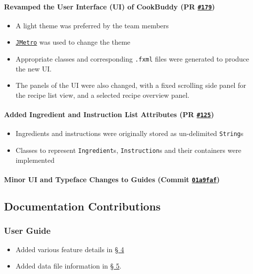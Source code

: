 \documentclass[11pt,british]{article}
\begin{document}
\paragraph{Revamped the User Interface (UI) of CookBuddy (PR \href{https://github.com/AY1920S2-CS2103T-W12-4/main/pull/179}{\texttt{\#179}}) } 
\begin{itemize}
	\item A light theme was preferred by the team members
	\item \href{https://pixelduke.com/java-javafx-theme-jmetro/}{\texttt{JMetro}} was used to change the theme
	\item Appropriate classes and corresponding \texttt{.fxml} files were generated to produce the new UI.
	\item The panels of the UI were also changed, with a fixed scrolling side panel for the recipe list view, and a selected recipe overview panel.
\end{itemize}

\paragraph{Added Ingredient and Instruction List Attributes (PR \href{https://github.com/AY1920S2-CS2103T-W12-4/main/pull/125}{\texttt{\#125}}) }
\begin{itemize}
	\item Ingredients and instructions were originally stored as un-delimited \texttt{String}s
	\item Classes to represent \texttt{Ingredient}s, \texttt{Instruction}s and their containers were implemented
\end{itemize}

\paragraph{Minor UI and Typeface Changes to Guides (Commit \href{https://github.com/AY1920S2-CS2103T-W12-4/main/pull/319/commits/01a9faffe83f12997f9eba13a2b92e6f4322167d}{\texttt{01a9faf}}) }

\subsection{Documentation Contributions}
\subsubsection{User Guide}
\begin{itemize}
	\item Added various feature details in \href{https://ay1920s2-cs2103t-w12-4.github.io/main/UserGuide.html#features}{\S{} 4}
	\item Added data file information in \href{https://ay1920s2-cs2103t-w12-4.github.io/main/UserGuide.html#configuration-and-recipe-data-sharadh}{\S{} 5}.
\end{itemize}
\end{document}
